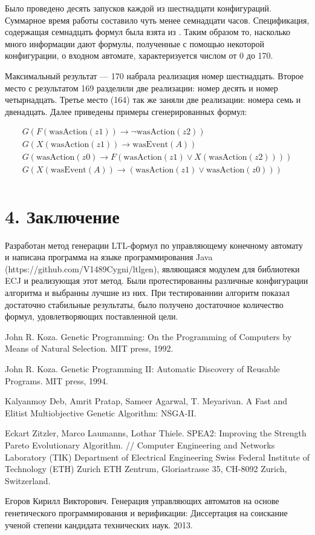 \documentclass[12pt,fleqn]{article}
\begin{document}
Было проведено десять запусков каждой из шестнадцати конфигураций. Суммарное время работы составило чуть менее семнадцати часов.
Спецификация, содержащая семнадцать формул была взята из \cite{eg}.
Таким образом то, насколько много информации дают формулы, полученные с помощью некоторой конфигурации, о входном автомате,
характеризуется числом от 0 до 170.

Максимальный результат --- 170 набрала реализация номер шестнадцать. Второе место с результатом 169 разделили две реализации:
номер десять и номер четырнадцать. Третье место (164) так же заняли две реализации: номера семь и двенадцать.
Далее приведены примеры сгенерированных формул: 

\begin{multline*}
G(F(\text{wasAction}(z1)) \rightarrow \lnot \text{wasAction}(z2))\\
G(X(\text{wasAction}(z1)) \rightarrow \text{wasEvent}(A))\\
G(\text{wasAction}(z0) \rightarrow F(\text{wasAction}(z1) \vee X(\text{wasAction}(z2))))\\
G(X(\text{wasEvent}(A)) \rightarrow (\text{wasAction}(z1) \vee \text{wasAction}(z0)))\\
\end{multline*}

\section{4. Заключение}

Разработан метод генерации LTL-формул по управляющему конечному автомату и написана программа на языке программирования Java
(https://github.com/V1489Cygni/ltlgen), являющаяся модулем для библиотеки ECJ и реализующая этот метод.
Были протестированны различные конфигурации алгоритма и выбранны лучшие из них. При тестированнии алгоритм показал
достаточно стабильные результаты, было получено достаточное количество формул, удовлетворяющих поставленной цели.

\begin{thebibliography}{5}

John R. Koza. Genetic Programming: On the Programming of Computers by Means of Natural Selection. MIT press, 1992.

John R. Koza. Genetic Programming II: Automatic Discovery of Reusable Programs. MIT press, 1994.

Kalyanmoy Deb, Amrit Pratap, Sameer Agarwal, T. Meyarivan. A Fast and Elitist Multiobjective Genetic Algorithm: NSGA-II.

Eckart Zitzler, Marco Laumanns, Lothar Thiele. SPEA2: Improving the Strength Pareto Evolutionary Algorithm. //
Computer Engineering and Networks Laboratory (TIK)
Department of Electrical Engineering
Swiss Federal Institute of Technology (ETH) Zurich
ETH Zentrum, Gloriastrasse 35, CH-8092 Zurich, Switzerland.

Егоров Кирилл Викторович. Генерация управляющих автоматов на основе генетического программирования и верификации: 
Диссертация на соискание ученой степени кандидата технических наук. 2013.   

\end{thebibliography}
\end{document}
